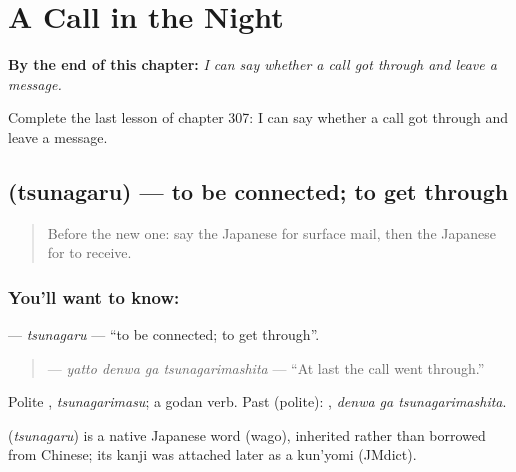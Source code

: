 
\chapter{A Call in the Night}
\label{ch:ja-a-call-in-the-night}

\begin{chapteropening}
\textbf{By the end of this chapter:} \emph{I can say whether a call got through and leave a message.}

Complete the last lesson of chapter 307: I can say whether a call got through and leave a message.
\end{chapteropening}

\section[\texorpdfstring{\ja{つながる} (tsunagaru)}{つながる (tsunagaru)}]{ (tsunagaru) — to be connected; to get through}

\label{lesson:JA-C307-tsunagaru}



\begin{quote}
Before the new one: say the Japanese for surface mail, then the Japanese for to receive.
\end{quote}

\subsection*{You'll want to know: }
\textbf{} — \emph{tsunagaru} — \textquotedblleft{}to be connected; to get through\textquotedblright{}.

\begin{quote}
\textbf{  } — \emph{yatto denwa ga tsunagarimashita} — \textquotedblleft{}At last the call went through.\textquotedblright{}
\end{quote}

Polite \textbf{}, \emph{tsunagarimasu}; a godan verb. Past (polite): \textbf{ }, \emph{denwa ga tsunagarimashita}.

\begin{cousinweb}
\textbf{} (\emph{tsunagaru}) is a native Japanese word (wago), inherited rather than borrowed from Chinese; its kanji was attached later as a kun'yomi (JMdict).
\end{cousinweb}

